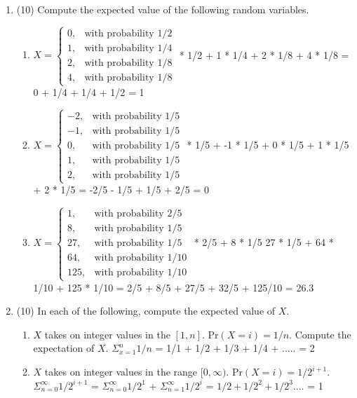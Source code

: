 \documentclass[12pt]{article}
\begin{document}
\begin{enumerate}
\begin{enumerate}
\end{enumerate}

\item (10)
Compute the expected value of the following random variables.
\begin{enumerate}
 \item $X = \begin{cases}
       0, &\textrm{with probability }1/2 \\
       1, &\textrm{with probability }1/4 \\
       2, &\textrm{with probability }1/8 \\
       4, &\textrm{with probability }1/8
       \end{cases}$ * 1/2 + 1 * 1/4 + 2 * 1/8 + 4 * 1/8 = 0 + 1/4 + 1/4 + 1/2 = 1
 \item $X = \begin{cases}
       -2, &\textrm{with probability }1/5 \\
       -1, &\textrm{with probability }1/5 \\
       0, &\textrm{with probability }1/5 \\
       1, &\textrm{with probability }1/5 \\
       2, &\textrm{with probability }1/5
       \end{cases}$ * 1/5 + -1 * 1/5 + 0 * 1/5 + 1 * 1/5 + 2 * 1/5 = -2/5 - 1/5 + 1/5 + 2/5 = 0
 \item $X = \begin{cases}
       1, &\textrm{with probability }2/5 \\
       8, &\textrm{with probability }1/5 \\
       27, &\textrm{with probability }1/5 \\
       64, &\textrm{with probability }1/10 \\
       125, &\textrm{with probability }1/10
       \end{cases}$ * 2/5 + 8 * 1/5 27 * 1/5 + 64 * 1/10 + 125 * 1/10 = 2/5 + 8/5 + 27/5 + 32/5 + 125/10 = 26.3
\end{enumerate}

\item (10)
In each of the following, compute the expected value of $X$.
\begin{enumerate}
 \item $X$ takes on integer values in the $[1,n]$. Pr$(X = i) = 1/n$. Compute the expectation of
 $X$. $\Sigma_{x = 1}^{n} 1/n$ =  1/1 + 1/2 + 1/3 + 1/4 + ..... = 2
 \item $X$ takes on integer values in the range $[0, \infty)$. Pr$(X = i) = 1/2^{i+1}$. $\Sigma_{n=0}^{\infty} 1/2^{i+1}$ = $\Sigma_{n=0}^{\infty} 1/2^{1}$ + $\Sigma_{n=1}^{\infty} 1/2^{i}$ = $1/2 + 1/2^2 + 1/2^3....$ = 1
\end{enumerate}


\end{enumerate}
\end{document}
